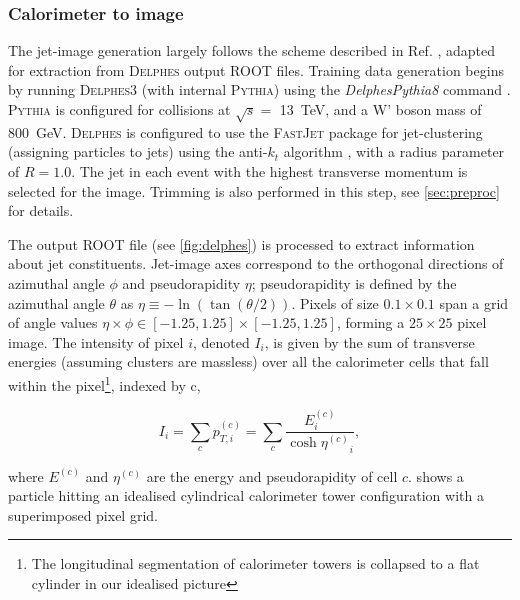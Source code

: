 \documentclass[twocolumn]{article}
\newcommand{\pkg}[1]{\textsc{#1}}
\begin{document}
\subsubsection{Calorimeter to image}
The jet-image generation largely follows the scheme described in Ref. \cite{de2015jet}, adapted for extraction from \pkg{Delphes} output \pkg{ROOT} files. Training data generation begins by running \pkg{Delphes}3 (with internal \pkg{Pythia}) using the \textit{DelphesPythia8} command \cite{workbook}. \pkg{Pythia} is configured for collisions at $\sqrt{s} =$ \SI{13}{\tera\electronvolt}, and a W' boson mass of \SI{800}{\giga\electronvolt}. \pkg{Delphes} is configured to use the \pkg{FastJet} \cite{fastjet} package for jet-clustering (assigning particles to jets) using the anti-$k_t$ algorithm \cite{antikt}, with a radius parameter of $R=1.0$. The jet in each event with the highest transverse momentum is selected for the image. Trimming is also performed in this step, see \cref{sec:preproc} for details.

The output \pkg{ROOT} file (see \cref{fig:delphes}) is processed to extract information about jet constituents. Jet-image axes correspond to the orthogonal directions of azimuthal angle $\phi$ and pseudorapidity $\eta$; pseudorapidity is defined by the azimuthal angle $\theta$ as $\eta \equiv -\ln(\tan(\theta/2))$. Pixels of size $0.1 \times 0.1$ span a grid of angle values $\eta \times \phi \in [-1.25, 1.25]\times [-1.25, 1.25]$, forming a $25\times 25$ pixel image. The intensity of pixel $i$, denoted $I_i$, is given by the sum of transverse energies (assuming clusters are massless) over all the calorimeter cells that fall within the pixel\footnote{The longitudinal segmentation of calorimeter towers is collapsed to a flat cylinder in our idealised picture}, indexed by c, 

\begin{equation}
I_i = \sum_c p_{T, i}^{(c)} = \sum_c\frac{E^{(c)}_i}{\cosh{\eta^{(c)}}_i} ,
\label{eq:intensity}
\end{equation}

where $E^{(c)}$ and $\eta^{(c)}$ are the energy and pseudorapidity of cell $c$.  shows a particle hitting an idealised cylindrical calorimeter tower configuration with a superimposed pixel grid.

%	
%	
\end{document}
